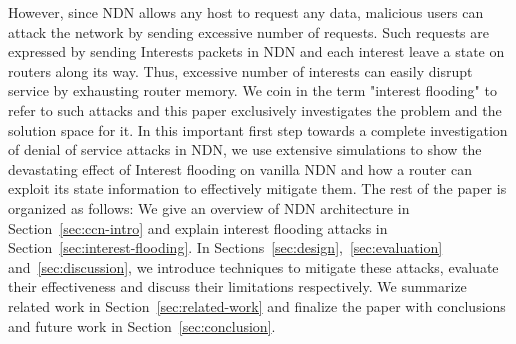However, since NDN allows any host to request any data, malicious users can attack the network by sending excessive number of requests. Such requests are expressed by sending Interests packets in NDN and each interest leave a state on routers along its way. Thus, excessive number of interests can easily disrupt service by exhausting router memory. We coin in the term "interest flooding" to refer to such attacks and
this paper exclusively investigates the problem and the solution space for it. In this important first step towards a complete investigation of denial of service attacks in NDN, we use extensive simulations to show the devastating effect of Interest flooding on vanilla NDN and how a router can exploit its state information to effectively mitigate them.  %
The rest of the paper is organized as follows: We give an overview of NDN architecture in Section~\ref{sec:ccn-intro} and explain interest flooding attacks in Section~\ref{sec:interest-flooding}. In Sections~\ref{sec:design},~\ref{sec:evaluation} and~\ref{sec:discussion}, we introduce techniques to mitigate these attacks, evaluate their effectiveness and discuss their limitations respectively. We summarize related work in Section~\ref{sec:related-work} and finalize the paper with conclusions and future work in Section~\ref{sec:conclusion}.




